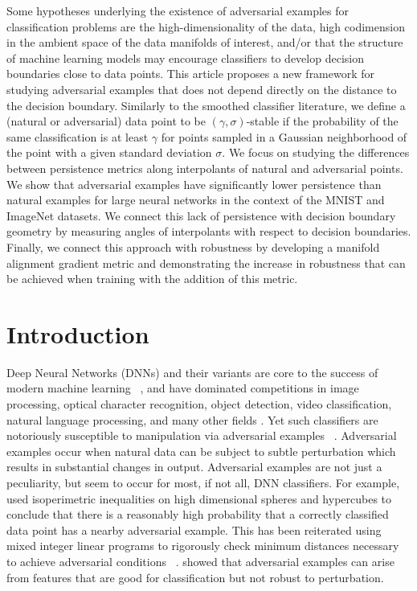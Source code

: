 
Some hypotheses underlying the existence of adversarial examples for classification problems are the high-dimensionality of the data, high codimension in the ambient space of the data manifolds of interest, and/or that the structure of machine learning models may encourage classifiers to develop decision boundaries close to data points. 
This article proposes a new framework for studying adversarial examples that does not depend directly on the distance to the decision boundary. 
Similarly to the smoothed classifier literature, we define a (natural or adversarial) data point to be $(\gamma,\sigma)$-stable if the probability of the same classification is at least $\gamma$ for points sampled in a Gaussian neighborhood of the point with a given standard deviation $\sigma$. 
We focus on studying the differences between persistence metrics along interpolants of natural and adversarial points.
We show that adversarial examples have significantly lower persistence than natural examples for large neural networks in the context of the MNIST and ImageNet datasets. 
We connect this lack of persistence with decision boundary geometry by measuring angles of interpolants with respect to decision boundaries.
Finally, we connect this approach with robustness by developing a manifold alignment gradient metric and demonstrating the increase in robustness that can be achieved when training with the addition of this metric. 

\section{Introduction}

Deep Neural Networks (DNNs) and their variants are core to the success of modern machine learning ~\citep{prakash2018}, and have dominated competitions in image processing, optical character recognition, object detection, video classification, natural language processing, and many other fields \citep{SCHMIDHUBER201585}. Yet such classifiers are notoriously susceptible to manipulation via adversarial examples ~\citep{szegedy2013}. Adversarial examples occur when natural data can be subject to subtle perturbation which results in substantial changes in output. Adversarial examples are not just a peculiarity, but seem to occur for most, if not all, DNN classifiers. For example, \citet{inevitable2018} used isoperimetric inequalities on high dimensional spheres and hypercubes to conclude that there is a reasonably high probability that a correctly classified data point has a nearby adversarial example. This has been reiterated using mixed integer linear programs to rigorously check minimum distances necessary to achieve adversarial conditions ~\citep{tjeng2017evaluating}. \citet{ilyas2019adversarial} showed that adversarial examples can arise from features that are good for classification but not robust to perturbation. 

